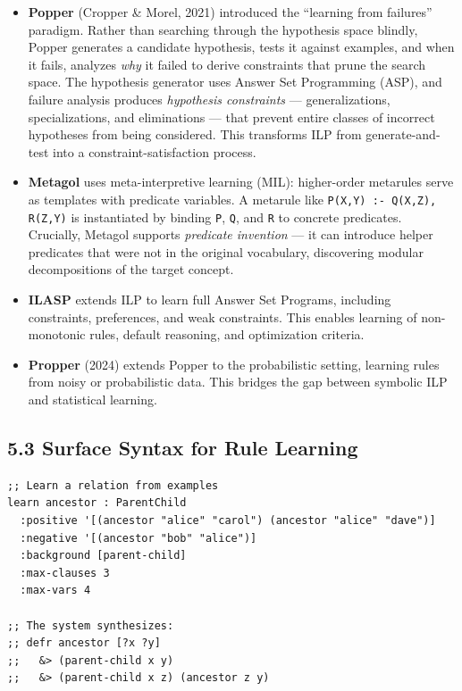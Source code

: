 \documentclass[11pt]{article}
\begin{document}
\begin{itemize}
\item \textbf{Popper} (Cropper \& Morel, 2021) introduced the
``learning from failures'' paradigm. Rather than searching through
the hypothesis space blindly, Popper generates a candidate
hypothesis, tests it against examples, and when it fails, analyzes
\emph{why} it failed to derive constraints that prune the search space.
The hypothesis generator uses Answer Set Programming (ASP), and
failure analysis produces \emph{hypothesis constraints} --- generalizations,
specializations, and eliminations --- that prevent entire classes of
incorrect hypotheses from being considered. This transforms ILP from
generate-and-test into a constraint-satisfaction process.

\item \textbf{Metagol} uses meta-interpretive learning (MIL): higher-order
metarules serve as templates with predicate variables. A metarule
like \texttt{P(X,Y) :- Q(X,Z), R(Z,Y)} is instantiated by binding \texttt{P},
\texttt{Q}, and \texttt{R} to concrete predicates. Crucially, Metagol supports
\emph{predicate invention} --- it can introduce helper predicates that
were not in the original vocabulary, discovering modular
decompositions of the target concept.

\item \textbf{ILASP} extends ILP to learn full Answer Set Programs, including
constraints, preferences, and weak constraints. This enables
learning of non-monotonic rules, default reasoning, and optimization
criteria.

\item \textbf{Propper} (2024) extends Popper to the probabilistic setting,
learning rules from noisy or probabilistic data. This bridges the
gap between symbolic ILP and statistical learning.
\end{itemize}
\subsection{5.3 Surface Syntax for Rule Learning}
\label{sec:orgaedf4f1}

\begin{verbatim}
;; Learn a relation from examples
learn ancestor : ParentChild
  :positive '[(ancestor "alice" "carol") (ancestor "alice" "dave")]
  :negative '[(ancestor "bob" "alice")]
  :background [parent-child]
  :max-clauses 3
  :max-vars 4

;; The system synthesizes:
;; defr ancestor [?x ?y]
;;   &> (parent-child x y)
;;   &> (parent-child x z) (ancestor z y)
\end{verbatim}
\end{document}

